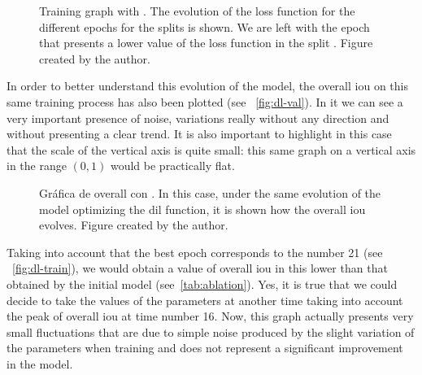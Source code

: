 \begin{figure}[p]
  \centering
  \caption[Training graph with ]{Training graph with
    . The evolution of the loss function for the different
    epochs for the  splits is shown. We are left with the epoch
    that presents a lower value of the loss function in the split
    . Figure created by the author.}%
  \label{fig:dl-train}
\end{figure}

In order to better understand this evolution of the model, the overall
\gls{iou} on this same training process has also been plotted (see \
\vref{fig:dl-val}). In it we can see a very important presence of noise,
variations really without any direction and without presenting a clear
trend. It is also important to highlight in this case that the scale of the
vertical axis is quite small: this same graph on a vertical axis in the range
\((0, 1)\) would be practically flat.

\begin{figure}[p]
  \centering
  \caption[Overall  graph with ]{Gráfica
    de overall \glsentryshort{iou} con \glsentrylong{dil}. In this case, under
    the same evolution of the model optimizing the \gls{dil} function, it is
    shown how the overall \gls{iou} evolves. Figure created by the author.}%
  \label{fig:dl-val}
\end{figure}

Taking into account that the best epoch corresponds to the number 21 (see \
\vref{fig:dl-train}), we would obtain a value of overall \gls{iou} in this
lower than that obtained by the initial model (see\ \vref{tab:ablation}). Yes,
it is true that we could decide to take the values of the parameters at another
time taking into account the peak of overall \gls{iou} at time number 16. Now,
this graph actually presents very small fluctuations that are due to simple
noise produced by the slight variation of the parameters when training and does
not represent a significant improvement in the model.

